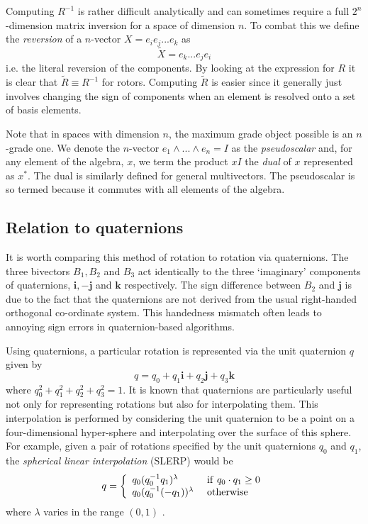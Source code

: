 Computing $R^{-1}$ is rather difficult analytically and can sometimes
require a full $2^n$-dimension matrix inversion for a space of
dimension $n$. To combat this we define
the \emph{reversion} of a $n$-vector $X = e_ie_j...e_k$ as
\[
\tilde{X} = e_k...e_je_i
\]
i.e. the literal reversion of the components. By looking at the expression for
$R$ it is clear that $\tilde{R} \equiv R^{-1}$ for rotors. Computing
$\tilde{R}$ is easier since it generally just involves changing the sign of
components when an element is resolved onto a set of basis elements.

Note that in spaces with dimension $n$, the maximum grade object possible is
an $n$-grade one. We denote the $n$-vector $e_1 \wedge ... \wedge e_n = I$ as
the \emph{pseudoscalar} and, for any element of the algebra, $x$,
we term the product $xI$ the \emph{dual} of $x$ represented as
$x^*$. The dual is similarly defined for general multivectors. The
pseudoscalar is so termed because it commutes with all elements of the
algebra.

\subsection{Relation to quaternions}
\label{sec:quaternions}

It is worth comparing this method of rotation to rotation via
quaternions. The three bivectors $B_1,B_2$ and $B_3$ act identically to the
three `imaginary' components of quaternions, $\mathbf{i}, -\mathbf{j}$ and
$\mathbf{k}$ respectively. The sign difference between $B_2$ and $\mathbf{j}$
is due to the fact that the quaternions are not derived from the usual
right-handed orthogonal co-ordinate system. This handedness mismatch often
leads to annoying sign errors in quaternion-based algorithms.

Using quaternions, a particular rotation is represented via the unit quaternion 
$q$ given by
\[
q = q_0 + q_1 \mathbf{i} + q_2 \mathbf{j} + q_3 \mathbf{k}
\]
where $q_0^2 + q_1^2 + q_2^2 + q_3^2 = 1$. 
It is known\cite{ACM:325242} that quaternions are particularly useful
not only for representing rotations but also for interpolating them.
This interpolation is performed by considering the unit quaternion to
be a point on a four-dimensional hyper-sphere and interpolating over 
the surface of this sphere. For example, given a pair of rotations specified
by the
unit quaternions $q_0$ and $q_1$, the \emph{spherical linear interpolation} (SLERP)
would be
\[
q = \left\{
\begin{array}{ll}
q_0(q_0^{-1}q_1)^\lambda & {\rm ~if~} q_0 \cdot q_1 \ge 0 \\
q_0(q_0^{-1}(-q_1))^\lambda & {\rm ~otherwise}
\end{array}
\right.
\]
where $\lambda$ varies in the range $(0,1)$ \cite{slerp}.

